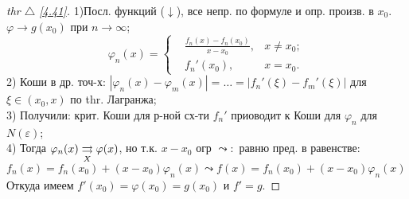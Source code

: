 \begin{minipage}[]{0.9\textwidth}
\begin{proof}[
 thr $\triangle$
\eqref{4.41}]

\phantom{42}
\noindent

1)Посл. функций ($\downarrow$), все непр. по формуле и опр. произв. в $x_0$. $\varphi \to g(x_0) $ при $n \to \infty$;\\
\begin{equation*}
\varphi_n(x) =
\left\{
	\begin{aligned}
		&\frac{f_n(x) - f_n(x_0)}{x-x_0}, &x \neq x_0;\\
		&f_n'(x_0), &x = x_0.
	\end{aligned}
\right.
\end{equation*}
2) Коши в др. точ-х: $|\varphi_n(x) - \varphi_m(x)|= \ldots = |f_n'(\xi) - f_m'(\xi)|$ для $\xi \in (x_0, x)$ по thr. Лагранжа;\\
3) Получили: крит. Коши для р-ной сх-ти $f_n'$ приоводит к Коши для $\varphi_n$ для $N(\varepsilon)$;\\
4) Тогда $\varphi_n(x) \underset{X}{\rightrightarrows} \varphi(x)$, но т.к. $x-x_0$ огр $\leadsto:$ равню пред. в равенстве:\\
$f_n(x) = f_n(x_0) + (x - x_0) \varphi_n (x) \leadsto f(x) = f_n(x_0) + (x - x_0) \varphi_n (x)$\\
Откуда имеем $f'(x_0) = \varphi(x_0) = g(x_0)$ и $f' = g$.
\end{proof}
\end{minipage}